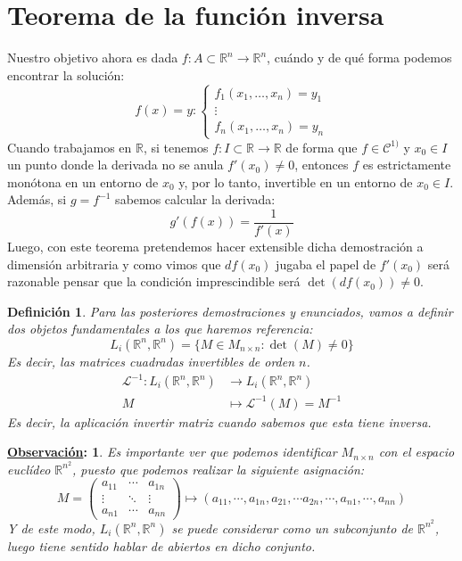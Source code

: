 \documentclass[10pt,a4paper,openright]{book}
\theoremstyle{break}
\newtheorem*{defi}{Definición}
\newtheorem*{obs}{\underline{Observación}:}
\begin{document}
\section{Teorema de la función inversa}
Nuestro objetivo ahora es dada $f : A \subset \mathbb{R}^n \to \mathbb{R}^n$, cuándo y de qué forma podemos encontrar la solución:
$$ f(x) = y : \begin{cases} f_1 (x_1,…,x_n )=y_1 \\ \vdots \\ f_n (x_1,…,x_n )=y_n \end{cases}$$
Cuando trabajamos en $\mathbb{R}$, si tenemos $f : I \subset \mathbb{R} \to \mathbb{R}$ de forma que $f \in \mathcal{C}^{1)}$ y $x_0 \in I$ un punto donde la derivada no se anula $f'(x_0) \neq 0$, entonces $f$ es estrictamente monótona en un entorno de $x_0$ y, por lo tanto, invertible en un entorno de $x_0 \in I$. Además, si $g=f^{-1}$ sabemos calcular la derivada: 
$$g' (f(x)) = \frac{1}{f'(x)}$$
Luego, con este teorema pretendemos hacer extensible dicha demostración a dimensión arbitraria y como vimos que $df(x_0)$ jugaba el papel de $f'(x_0)$ será razonable pensar que la condición imprescindible será $\det (df(x_0)) \neq 0$.

\begin{defi}
Para las posteriores demostraciones y enunciados, vamos a definir dos objetos fundamentales a los que haremos referencia:
$$L_i (\mathbb{R}^n, \mathbb{R}^n) = \{M \in M_{n \times n} : \det (M) \neq 0\}$$
Es decir, las matrices cuadradas invertibles de orden $n$.
\begin{align*}
\mathcal{L}^{-1} : L_i (\mathbb{R}^n, \mathbb{R}^n) &\to L_i (\mathbb{R}^n, \mathbb{R}^n) \\ M &\mapsto \mathcal{L}^{-1} (M) = M^{-1}
\end{align*}
Es decir, la aplicación invertir matriz cuando sabemos que esta tiene inversa.
\end{defi}

\begin{obs}
Es importante ver que podemos identificar $M_{n \times n}$ con el espacio euclídeo $\mathbb{R}^{n^2}$, puesto que podemos realizar la siguiente asignación:
$$M = \begin{pmatrix}
a_{11} & \cdots & a_{1n} \\ \vdots & \ddots & \vdots \\ a_{n1} & \cdots & a_{nn}
\end{pmatrix} \longmapsto (a_{11}, \cdots, a_{1n} ,a_{21}, \cdots a_{2n}, \cdots, a_{n1}, \cdots, a_{nn})$$
Y de este modo, $L_i (\mathbb{R}^n, \mathbb{R}^n)$ se puede considerar como un subconjunto de $\mathbb{R}^{n^2}$, luego tiene sentido hablar de abiertos en dicho conjunto.
\end{obs}
\end{document}
